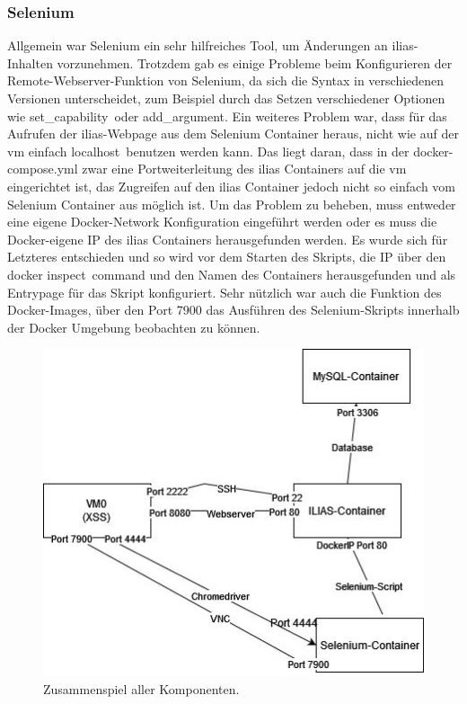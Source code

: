 \documentclass[10pt, a4paper,onecolumn ,titlepage]{article}
\begin{document}
    \subsubsection{Selenium}
    \label{subsubsec:lessonslearnedSelenium}
    Allgemein war Selenium ein sehr hilfreiches Tool, um Änderungen an \ac{ilias}-Inhalten vorzunehmen.
    Trotzdem gab es einige Probleme beim Konfigurieren der Remote-Webserver-Funktion von Selenium, da sich die Syntax in verschiedenen Versionen unterscheidet, zum Beispiel durch das Setzen verschiedener Optionen wie \glqq set\_capability\grqq\ oder \glqq add\_argument\grqq.
    Ein weiteres Problem war, dass für das Aufrufen der \ac{ilias}-Webpage aus dem Selenium Container heraus, nicht wie auf der \ac{vm} einfach \glqq localhost\grqq\ benutzen werden kann.
    Das liegt daran, dass in der docker-compose.yml zwar eine Portweiterleitung des \ac{ilias} Containers auf die \ac{vm} eingerichtet ist, das Zugreifen auf den \ac{ilias} Container jedoch nicht so einfach vom Selenium Container aus möglich ist.
    Um das Problem zu beheben, muss entweder eine eigene Docker-Network Konfiguration eingeführt werden oder es muss die Docker-eigene IP des \ac{ilias} Containers herausgefunden werden.
    Es wurde sich für Letzteres entschieden und so wird vor dem Starten des Skripts, die IP über den \glqq docker inspect\grqq\ command und den Namen des Containers herausgefunden und als Entrypage für das Skript konfiguriert.
    \noindent
    Sehr nützlich war auch die Funktion des Docker-Images, über den Port 7900 das Ausführen des Selenium-Skripts innerhalb der Docker Umgebung beobachten zu können.

    \begin{figure}[H]
        \centering
        \includegraphics[width=1\textwidth]{other_pictures/selenium_pic}
        \caption{Zusammenspiel aller Komponenten.}
        \label{fig:seleniumPicture}
    \end{figure}
\end{document}
